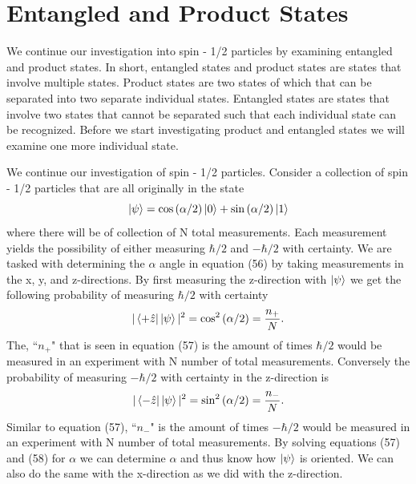 \documentclass[twocolumn]{article}
\begin{document}
\section*{Entangled and Product States}
We continue our investigation into spin - 1/2 particles by examining entangled and product states. In short, entangled states and product states are states that involve multiple states. Product states are two states of which that can be separated into two separate individual states. Entangled states are states that involve two states that cannot be separated such that each individual state can be recognized. Before we start investigating product and entangled states we will examine one more individual state.

We continue our investigation of spin - 1/2 particles. Consider a collection of spin - 1/2 particles that are all originally in the state
\begin{equation}
\ket{\psi}=\cos{(\alpha/2)}\ket{0}+\sin{(\alpha/2)}\ket{1}
\end{equation}
where there will be of collection of N total measurements. Each measurement yields the possibility of either measuring $\hbar/2$ and $-\hbar/2$ with certainty. We are tasked with determining the $\alpha$ angle in equation (56) by taking measurements in the x, y, and z-directions. By first measuring the z-direction with $\ket{\psi}$ we get the following probability of measuring $\hbar/2$ with certainty
\begin{equation}
|\bra{+\hat{z}}\ket{\psi}|^2=\cos^2{(\alpha/2)}=\frac{n_+}{N}.
\end{equation}
The, ``$n_+$" that is seen in equation (57) is the amount of times $\hbar/2$ would be measured in an experiment with N number of total measurements. Conversely the probability of measuring $-\hbar/2$ with certainty in the z-direction is
\begin{equation}
|\bra{-\hat{z}}\ket{\psi}|^2=\sin^2{(\alpha/2)}=\frac{n_-}{N}.
\end{equation}
Similar to equation (57), ``$n_-$" is the amount of times $-\hbar/2$ would be measured in an experiment with N number of total measurements. By solving equations (57) and (58) for $\alpha$ we can determine $\alpha$ and thus know how $\ket{\psi}$ is oriented. We can also do the same with the x-direction as we did with the z-direction.
\end{document}
